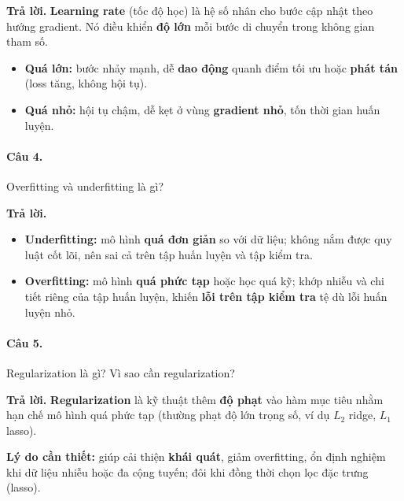 \medskip\noindent\textbf{Trả lời.} \textbf{Learning rate} (tốc độ học) là hệ số nhân cho bước cập nhật theo hướng gradient. Nó điều khiển \textbf{độ lớn} mỗi bước di chuyển trong không gian tham số.

\begin{itemize}[nosep]
\item \textbf{Quá lớn:} bước nhảy mạnh, dễ \textbf{dao động} quanh điểm tối ưu hoặc \textbf{phát tán} (loss tăng, không hội tụ).
\item \textbf{Quá nhỏ:} hội tụ chậm, dễ kẹt ở vùng \textbf{gradient nhỏ}, tốn thời gian huấn luyện.
\end{itemize}

\paragraph{Câu 4.} Overfitting và underfitting là gì?

\medskip\noindent\textbf{Trả lời.}
\begin{itemize}[nosep]
\item \textbf{Underfitting:} mô hình \textbf{quá đơn giản} so với dữ liệu; không nắm được quy luật cốt lõi, nên sai cả trên tập huấn luyện và tập kiểm tra.
\item \textbf{Overfitting:} mô hình \textbf{quá phức tạp} hoặc học quá kỹ; khớp nhiễu và chi tiết riêng của tập huấn luyện, khiến \textbf{lỗi trên tập kiểm tra} tệ dù lỗi huấn luyện nhỏ.
\end{itemize}

\paragraph{Câu 5.} Regularization là gì? Vì sao cần regularization?

\medskip\noindent\textbf{Trả lời.} \textbf{Regularization} là kỹ thuật thêm \textbf{độ phạt} vào hàm mục tiêu nhằm hạn chế mô hình quá phức tạp (thường phạt độ lớn trọng số, ví dụ $L_2$ ridge, $L_1$ lasso).

\textbf{Lý do cần thiết:} giúp cải thiện \textbf{khái quát}, giảm overfitting, ổn định nghiệm khi dữ liệu nhiễu hoặc đa cộng tuyến; đôi khi đồng thời chọn lọc đặc trưng (lasso).
